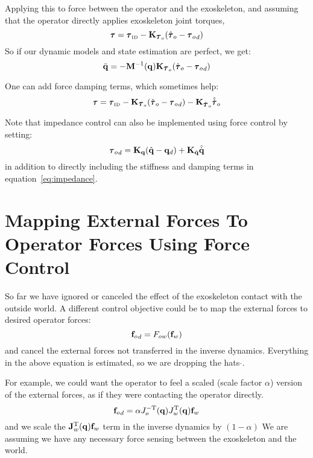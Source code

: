 \documentclass[letterpaper,12pt,fullpage]{article}
\newcommand{\invdyn}{{\mbox {\tiny ID}}}
\begin{document}
Applying this to force between the operator and the exoskeleton, and assuming
that the operator directly applies exoskeleton joint torques,
\begin{equation}
\vtau = \vtau_{\invdyn} - \mK_{\vtau_o} ( \hat{\vtau}_o - {\vtau_o}_d )
\end{equation}
So if our dynamic models and state estimation are perfect, we get:
\begin{equation}
\ddot{\vq} = - \mM^{-1} (\vq) \mK_{\vtau_o} ( \hat{\vtau}_o - {\vtau_o}_d )
\end{equation}

One can add force damping terms, which sometimes help:
\begin{equation}
\vtau = \vtau_{\invdyn} - \mK_{\vtau_o} ( \hat{\vtau}_o - {\vtau_o}_d )
- \mK_{\dot{\vtau}_o} \hat{\dot{\vtau}}_o
\end{equation}

Note that impedance control can also be implemented using force control
by setting:
\begin{equation}
{\vtau_o}_d = \mK_{\vq}( \hat{\vq} - \vq_d ) + \mK_{\dot{\vq}} \hat{\dot{\vq}}
\end{equation}
in addition to directly including the stiffness and damping terms in
equation~\ref{eq:impedance}. 

\section{Mapping External Forces To Operator Forces Using Force Control}

So far we have ignored or canceled the effect of 
the exoskeleton contact with the outside world.
A different control objective could be to map the external forces to 
desired operator forces:
\begin{equation}
{{\bf f}_o}_d = F_{ow} ( {\bf f}_w )
\end{equation}
and cancel the external forces not transferred in the inverse dynamics.
Everything in the above equation is estimated, so we are dropping the hats 
$\hat{\mbox{}}$.

For example, we could want the operator to feel a scaled (scale factor $\alpha$) 
version of the external
forces, as if they were contacting the operator directly.
\begin{equation}
{{\bf f}_o}_d = \alpha J_o^{-{\rm T}}({\bf q}) J_w^{{\rm T}}({\bf q}) {\bf f}_w
\end{equation}
and we scale the ${\bf J}_w^{{\rm T}}({\bf q}) {\bf f}_w$ term in the inverse dynamics
by $(1-\alpha)$
We are assuming we have any necessary force sensing between the exoskeleton and
the world.
\end{document}
